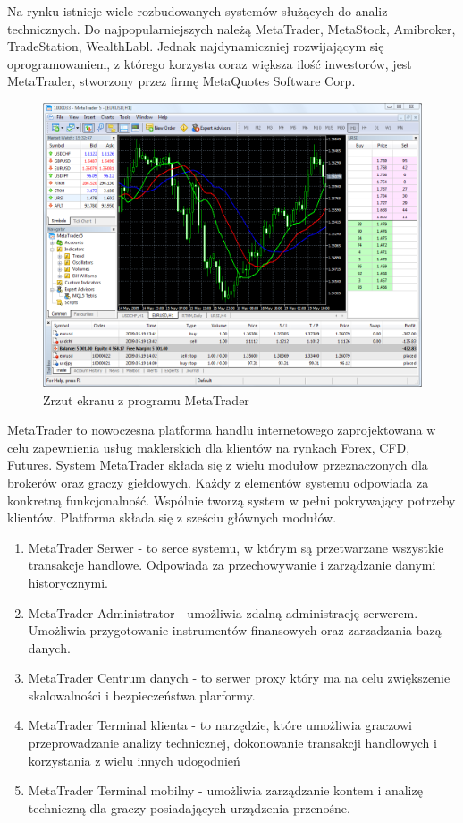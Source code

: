 \documentclass[pdflatex,11pt]{aghdpl}
\begin{document}
Na rynku istnieje wiele rozbudowanych systemów służących do analiz technicznych. Do najpopularniejszych należą MetaTrader, MetaStock, Amibroker, TradeStation, WealthLabl. Jednak najdynamiczniej rozwijającym się oprogramowaniem, z którego korzysta coraz większa ilość inwestorów, jest MetaTrader, stworzony przez firmę MetaQuotes Software Corp.
\begin{figure}[ht]
\begin{center}
\includegraphics[width=15cm]{metatrader.png}
\caption{Zrzut ekranu z programu MetaTrader}
\label{swieca2}
\end{center}
\end{figure} 
MetaTrader to nowoczesna platforma handlu internetowego zaprojektowana w celu zapewnienia usług maklerskich dla klientów na rynkach Forex, CFD, Futures. System MetaTrader składa się z wielu modułow przeznaczonych dla brokerów oraz graczy giełdowych. Każdy z elementów systemu odpowiada za konkretną funkcjonalność. Wspólnie tworzą system w pełni pokrywający potrzeby klientów. Platforma składa się z sześciu głównych modułów.
 \begin{enumerate}
\item MetaTrader Serwer - to serce systemu, w którym są przetwarzane wszystkie transakcje handlowe. Odpowiada za przechowywanie i zarządzanie danymi historycznymi.
\item MetaTrader Administrator - umożliwia zdalną administrację serwerem. Umożliwia przygotowanie instrumentów finansowych oraz zarzadzania bazą danych.
\item MetaTrader Centrum danych - to serwer proxy który ma na celu zwiększenie skalowalności i bezpieczeństwa plarformy.
\item MetaTrader Terminal klienta - to narzędzie, które umożliwia graczowi przeprowadzanie analizy technicznej, dokonowanie transakcji handlowych i korzystania z wielu innych udogodnień
\item MetaTrader Terminal mobilny - umożliwia zarządzanie kontem i analizę techniczną dla graczy posiadających urządzenia przenośne.
\end{enumerate}
\end{document}
